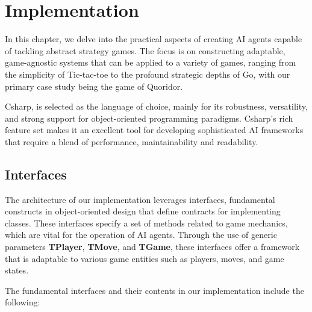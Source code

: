 \chapter{Implementation}

In this chapter, we delve into the practical aspects of creating \gls{AI} agents capable of tackling abstract strategy games. The focus is on constructing adaptable, game-agnostic systems that can be applied to a variety of games, ranging from the simplicity of Tic-tac-toe to the profound strategic depths of Go, with our primary case study being the game of Quoridor.

\gls{Csharp}, is selected as the language of choice, mainly for its robustness, versatility, and strong support for object-oriented programming paradigms. \gls{Csharp}'s rich feature set makes it an excellent tool for developing sophisticated \gls{AI} frameworks that require a blend of performance, maintainability and readability.

\section{Interfaces}
The architecture of our implementation leverages interfaces, fundamental constructs in object-oriented design that define contracts for implementing classes. These interfaces specify a set of methods related to game mechanics, which are vital for the operation of \gls{AI} agents. Through the use of generic parameters \textbf{TPlayer}, \textbf{TMove}, and \textbf{TGame}, these interfaces offer a framework that is adaptable to various game entities such as players, moves, and game states.

The fundamental interfaces and their contents in our implementation include the following:

